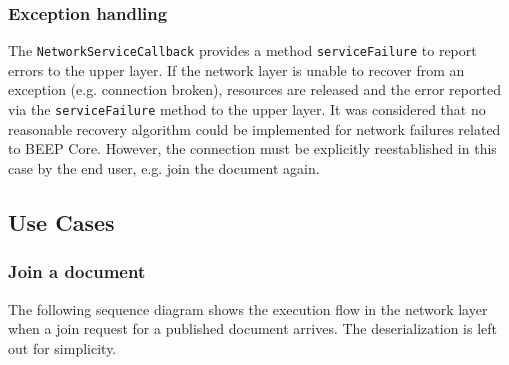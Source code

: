 \subsubsection{Exception handling}
\label{chapter:network.exceptionhandling}
The \texttt{NetworkServiceCallback} provides a method \texttt{serviceFailure} to report errors to the upper layer. If the network layer is unable to recover from an exception (e.g. connection broken), resources are released and the error reported via the \texttt{serviceFailure} method to the upper layer. It was considered that no reasonable recovery algorithm could be implemented for network failures related to BEEP Core. However, the connection must be explicitly reestablished in this case by the end user, e.g. join the document again.


\subsection{Use Cases}
\label{chaper:protocol.usecases}

\subsubsection{Join a document}
The following sequence diagram shows the execution flow in the network layer when a join request for a published document arrives. The deserialization is left out for simplicity.

